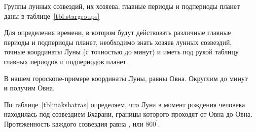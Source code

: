 Группы лунных созвездий, их хозяева, главные периоды и подпериоды планет даны в таблице~\ref{tbl:stargroups}

Для определения времени, в котором будут действовать различные главные периоды и подпериоды планет, необходимо знать хозяев лунных созвездий, точные координаты Луны (с точностью до минут) и иметь под рукой таблицу главных периодов и подпериодов планет.

В нашем гороскопе-примере координаты Луны, равны  Овна. Округлим до минут и получим  Овна.

По таблице~\ref{tbl:nakshatras} определяем, что Луна в момент рождения человека находилась под созвездием Бхарани, границы которого проходят от  Овна до  Овна. Протяженность каждого созвездия равна , или \(800^\prime\).


